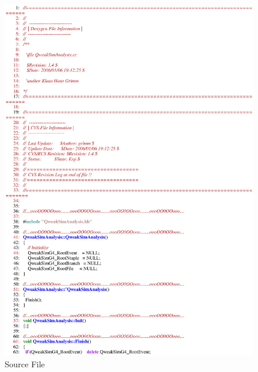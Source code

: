 \begin{figure}[h]
  \hspace{0cm}
  \includegraphics[scale=0.8]{./figures13/QweakSimAnalysis.cc-p1.eps}
  \caption{Source File}
           \label{fig:XIII-SC-3}
\end{figure}

\clearpage

